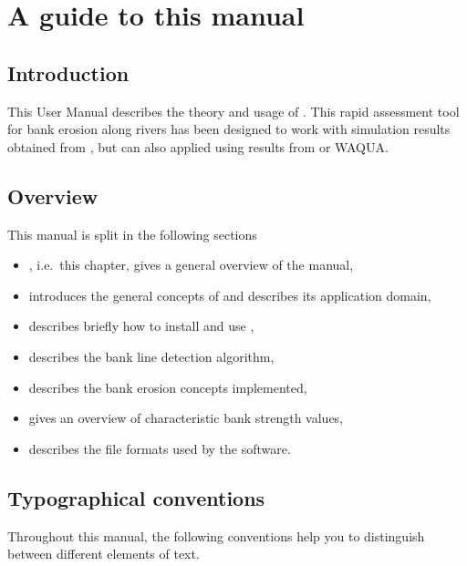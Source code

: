 \chapter{A guide to this manual} \label{Chp:Guide}

\section{Introduction}
This User Manual describes the theory and usage of \dfastbe.
This rapid assessment tool for bank erosion along rivers has been designed to work with simulation results obtained from \dflowfm, but can also applied using results from \dflow or WAQUA.

\section{Overview}
This manual is split in the following sections

\begin{itemize}
\item {}, i.e.~this chapter, gives a general overview of the manual,
\item {} introduces the general concepts of \dfastbe and describes its application domain,
\item {} describes briefly how to install and use \dfastbe,
\item {} describes the bank line detection algorithm,
\item {} describes the bank erosion concepts implemented,
\item {} gives an overview of characteristic bank strength values,
\item {} describes the file formats used by the software.
\end{itemize}

\section{Typographical conventions}
Throughout this manual, the following conventions help you to distinguish between different elements of text.

